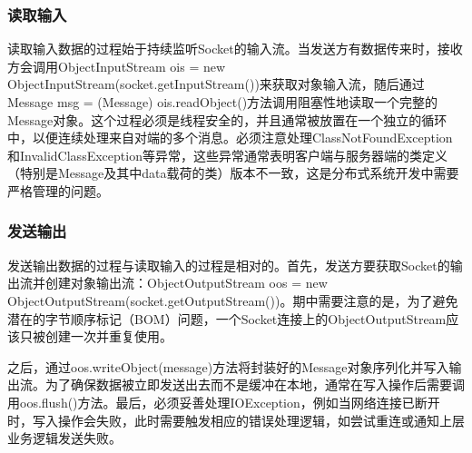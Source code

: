 \subsubsection{读取输入}
读取输入数据的过程始于持续监听Socket的输入流。当发送方有数据传来时，接收方会调用ObjectInputStream ois = new ObjectInputStream(socket.getInputStream())来获取对象输入流，随后通过Message msg = (Message) ois.readObject()方法调用阻塞性地读取一个完整的Message对象。这个过程必须是线程安全的，并且通常被放置在一个独立的循环中，以便连续处理来自对端的多个消息。必须注意处理ClassNotFoundException和InvalidClassException等异常，这些异常通常表明客户端与服务器端的类定义（特别是Message及其中data载荷的类）版本不一致，这是分布式系统开发中需要严格管理的问题。
\subsubsection{发送输出}
发送输出数据的过程与读取输入的过程是相对的。首先，发送方要获取Socket的输出流并创建对象输出流：ObjectOutputStream oos = new ObjectOutputStream(socket.getOutputStream())。期中需要注意的是，为了避免潜在的字节顺序标记（BOM）问题，一个Socket连接上的ObjectOutputStream应该只被创建一次并重复使用。

之后，通过oos.writeObject(message)方法将封装好的Message对象序列化并写入输出流。为了确保数据被立即发送出去而不是缓冲在本地，通常在写入操作后需要调用oos.flush()方法。最后，必须妥善处理IOException，例如当网络连接已断开时，写入操作会失败，此时需要触发相应的错误处理逻辑，如尝试重连或通知上层业务逻辑发送失败。

